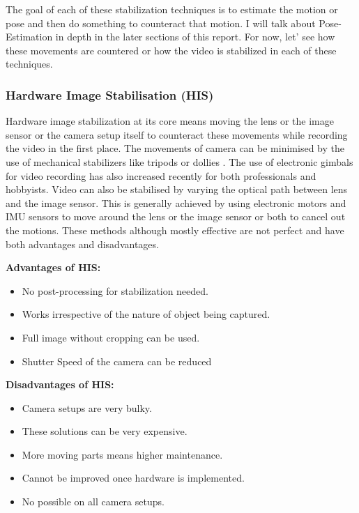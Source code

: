 The goal of each of these stabilization techniques is to estimate the motion or pose and then do something to counteract that motion. I will talk about Pose-Estimation in depth in the later sections of this report. For now, let' see how these movements are countered or how the video is stabilized in each of these techniques.

\subsubsection{Hardware Image Stabilisation (HIS)}
Hardware image stabilization at its core means moving the lens or the image sensor or the camera setup itself to counteract these movements while recording the video in the first place. The movements of camera can be minimised by the use of mechanical stabilizers like tripods or dollies \citep{5995525}. The use of electronic gimbals for video recording has also increased recently for both professionals and hobbyists. Video can also be stabilised by varying the optical path between lens and the image sensor. This is generally achieved by using electronic motors and IMU sensors to move around the lens or the image sensor or both to cancel out the motions. These methods although mostly effective are not perfect and have both advantages and disadvantages.

\textbf{Advantages of HIS: }

\begin{itemize}
\item No post-processing for stabilization needed.
\item Works irrespective of the nature of object being captured.
\item Full image without cropping can be used.
\item Shutter Speed of the camera can be reduced
\end{itemize}

\textbf{Disadvantages of HIS:}
\begin{itemize}
\item Camera setups are very bulky.
\item These solutions can be very expensive.
\item More moving parts means higher maintenance.
\item Cannot be improved once hardware is implemented.
\item No possible on all camera setups.
\end{itemize}

